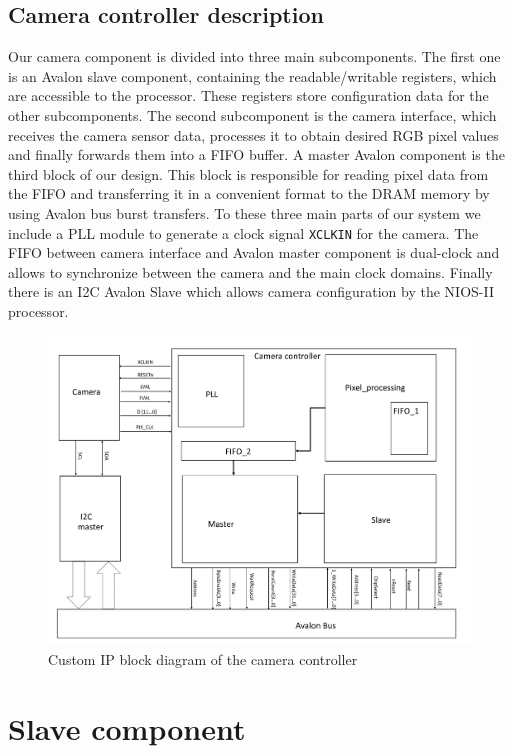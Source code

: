 \documentclass{article}
\begin{document}
\subsection{Camera controller description}

Our camera component is divided into three main subcomponents.
The first one is an Avalon slave component, containing the readable/writable registers, which are accessible to the processor. These registers store configuration data for the other subcomponents.
The second subcomponent is the camera interface, which receives the camera sensor data, processes it to obtain desired RGB pixel values and finally forwards them into a FIFO buffer. 
A master Avalon component is the third block of our design. This block is responsible for reading pixel data from the FIFO and transferring it in a convenient format to the DRAM memory by using Avalon bus burst transfers.
To these three main parts of our system we include a PLL module to generate a clock signal \verb'XCLKIN' for the camera. The FIFO between camera interface and Avalon master component is dual-clock and allows to synchronize between the camera and the main clock domains.
Finally there is an I2C Avalon Slave which allows camera configuration by the NIOS-II processor.

\begin{figure}[H]
\centering
\includegraphics[width=\textwidth]{cam_ctrl_physical_arch.png}
\caption{Custom IP block diagram of the camera controller}
\label{fig:cam_ctrl_physical_arch}
\end{figure}


\section{Slave component}
\end{document}
